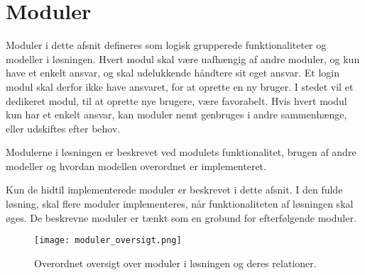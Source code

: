 \section{Moduler}
\label{sec:moduler}

Moduler i dette afsnit defineres som logisk grupperede funktionaliteter og modeller i løsningen. Hvert modul skal være uafhængig af andre moduler, og kun have et enkelt ansvar, og skal udelukkende håndtere sit eget ansvar. Et login modul skal derfor ikke have ansvaret, for at oprette en ny bruger. I stedet vil et dedikeret modul, til at oprette nye brugere, være favorabelt. Hvis hvert modul kun har et enkelt ansvar, kan moduler nemt genbruges i andre sammenhænge, eller udskiftes efter behov.

Modulerne i løsningen er beskrevet ved modulets funktionalitet, brugen af andre modeller og hvordan modellen overordnet er implementeret.

Kun de hidtil implementerede moduler er beskrevet i dette afsnit. I den fulde løsning, skal flere moduler implementeres, når funktionaliteten af løsningen skal øges. De beskrevne moduler er tænkt som en grobund for efterfølgende moduler.

\begin{figure}
  \centering
  \texttt{[image: moduler\_oversigt.png]}
  \caption{Overordnet oversigt over moduler i løsningen og deres relationer.}
\end{figure}








